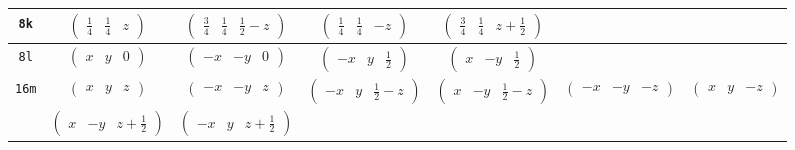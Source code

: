 \documentclass[fleqn,9pt,landscape]{jsarticle}
\begin{document}
\begin{center}
\begin{longtable}{ccccccc}
{\tt 8k} & $ \begin{pmatrix} \frac{1}{4} & \frac{1}{4} & z \end{pmatrix} $ & $ \begin{pmatrix} \frac{3}{4} & \frac{1}{4} & \frac{1}{2} - z \end{pmatrix} $ & $ \begin{pmatrix} \frac{1}{4} & \frac{1}{4} & - z \end{pmatrix} $ & $ \begin{pmatrix} \frac{3}{4} & \frac{1}{4} & z + \frac{1}{2} \end{pmatrix} $ & $  $ & $  $ \\ \hline
{\tt 8l} & $ \begin{pmatrix} x & y & 0 \end{pmatrix} $ & $ \begin{pmatrix} - x & - y & 0 \end{pmatrix} $ & $ \begin{pmatrix} - x & y & \frac{1}{2} \end{pmatrix} $ & $ \begin{pmatrix} x & - y & \frac{1}{2} \end{pmatrix} $ & $  $ & $  $ \\ \hline
{\tt 16m} & $ \begin{pmatrix} x & y & z \end{pmatrix} $ & $ \begin{pmatrix} - x & - y & z \end{pmatrix} $ & $ \begin{pmatrix} - x & y & \frac{1}{2} - z \end{pmatrix} $ & $ \begin{pmatrix} x & - y & \frac{1}{2} - z \end{pmatrix} $ & $ \begin{pmatrix} - x & - y & - z \end{pmatrix} $ & $ \begin{pmatrix} x & y & - z \end{pmatrix} $ \\
& $ \begin{pmatrix} x & - y & z + \frac{1}{2} \end{pmatrix} $ & $ \begin{pmatrix} - x & y & z + \frac{1}{2} \end{pmatrix} $ & $  $ & $  $ & $  $ & $  $ \\
\end{longtable}
\end{center}
\end{document}
